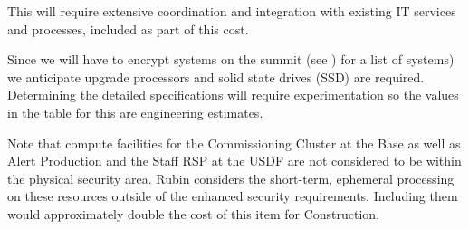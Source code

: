 This will require extensive coordination and integration with existing \gls{IT}
services and processes, included as part of this cost.

Since we will have to encrypt systems on the summit (see ) for a list of systems)
we anticipate upgrade processors and solid state drives (\gls{SSD}) are required. Determining the detailed specifications will require experimentation so the
values in the table for this are engineering estimates.

Note that compute facilities for the \gls{Commissioning} Cluster at the Base as well as Alert Production and the Staff RSP at the USDF are not considered to be within the physical security area.
Rubin considers the short-term, ephemeral processing on these resources outside of the enhanced security requirements. Including them would approximately double the cost of this item for \gls{Construction}.
